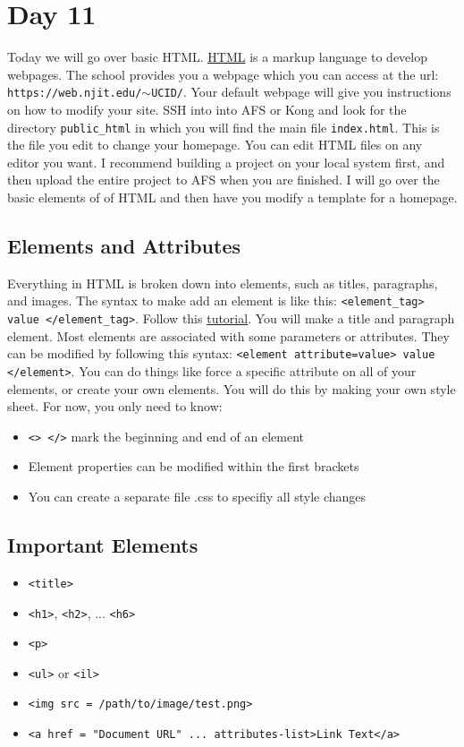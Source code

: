 \documentclass{article}
\begin{document}
\section{Day 11}
Today we will go over basic HTML. \href{https://en.wikipedia.org/wiki/HTML}{HTML} is a markup language to develop webpages. The school provides you a webpage which you can access at the url: \texttt{https://web.njit.edu/$\sim$UCID/}. Your default webpage will give you instructions on how to modify your site. SSH into into AFS or Kong and look for the directory \texttt{public\_html} in which you will find the main file \texttt{index.html}. This is the file you edit to change your homepage. You can edit HTML files on any editor you want. I recommend building a project on your local system first, and then upload the entire project to AFS when you are finished. I will go over the basic elements of of HTML and then have you modify a template for a homepage.

\subsection{Elements and Attributes}
Everything in HTML is broken down into elements, such as titles, paragraphs, and images. The syntax to make add an element is like this: \texttt{<element\_tag> value </element\_tag>}. Follow this \href{https://www.w3schools.com/html/html_basic.asp}{tutorial}. You will make a title and paragraph element. Most elements are associated with some parameters or attributes. They can be modified by following this syntax: \texttt{<element attribute=value> value </element>}. You can do things like force a specific attribute on all of your elements, or create your own elements. You will do this by making your own style sheet. For now, you only need to know:
\begin{itemize}
    \item \texttt{<> </>} mark the beginning and end of an element
    \item Element properties can be modified within the first brackets
    \item You can create a separate file .css to specifiy all style changes
\end{itemize}

\subsection{Important Elements}
\begin{itemize}
    \item \texttt{<title>}
    \item \texttt{<h1>}, \texttt{<h2>}, ... \texttt{<h6>}
    \item \texttt{<p>}
    \item \texttt{<ul>} or \texttt{<il>}
    \item \texttt{<img src = /path/to/image/test.png>}
    \item \texttt{<a href = "Document URL" ... attributes-list>Link Text</a>}
\end{itemize}
\end{document}
